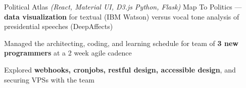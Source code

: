 

\begin{cventries}



\cventryproject
    {Political Atlas} %
    {\emph{(React, Material UI, D3.js Python, Flask)}}
    {} %
    {Map To Politics --- \textbf{data visualization} for textual (IBM Watson) versus vocal tone analysis of presidential speeches (DeepAffects)} %
    {
      \begin{cvitems} %
        \item {Managed the architecting, coding, and learning schedule for team of \textbf{3 new programmers} at a 2 week agile cadence}
        \item {Explored \textbf{webhooks, cronjobs, restful design, accessible design}, and securing VPSs with the team}
      \end{cvitems}
    }

\end{cventries}

